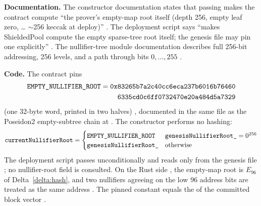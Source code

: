 \begin{specdelta}
\label{delta:empty-root}
\textbf{Documentation.} The constructor documentation states that passing
 makes the contract compute ``the prover's empty-map root
itself (depth 256, empty leaf zero,  \ldots{} $\sim$256 keccak at deploy)''
. The deployment script says
 ``makes ShieldedPool compute the empty sparse-tree root
itself; the genesis file may pin one explicitly''
. The nullifier-tree module
documentation describes full 256-bit addressing, 256 levels, and a path through
bits $0,\dots,255$ .

\textbf{Code.} The contract pins
\begin{align*}
  \texttt{EMPTY\_NULLIFIER\_ROOT} = {}&\texttt{0x83265b7a2c40cc6eca237b6016b76460}\\
                                    &\texttt{\phantom{0x}6335cd0c6ff0732470e20a484d5a7329}
\end{align*}
(one 32-byte word, printed in two halves)
, documented in the same file as
the Poseidon2 empty-subtree chain at 
. The constructor performs no
hashing:
\begin{equation}
  \texttt{currentNullifierRoot} =
  \begin{cases}
    \texttt{EMPTY\_NULLIFIER\_ROOT} & \texttt{genesisNullifierRoot\_} = 0^{256}\\
    \texttt{genesisNullifierRoot\_} & \text{otherwise}
  \end{cases}
\end{equation}
The deployment script passes  unconditionally
 and reads only
 from the genesis file
; no nullifier-root field is consulted.
On the Rust side 
, the empty-map root is $E_{96}$
of Delta~\ref{delta:hash}, and two nullifiers agreeing on the low 96 address
bits are treated as the same address
. The pinned constant
equals the  of the committed block vector
.


\end{specdelta}
